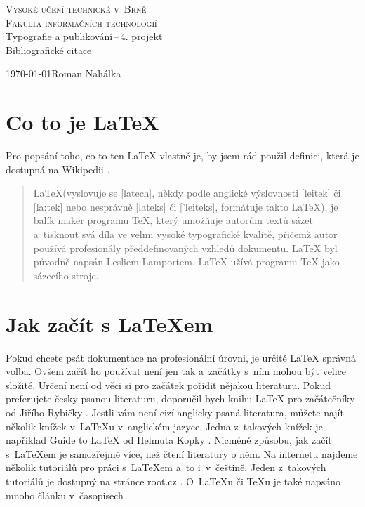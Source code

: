 \documentclass[a4paper, 11pt]{article}
\begin{document}
\begin{titlepage}
\begin{center}
{\Huge \textsc{Vysoké učení technické v~Brně}\\ \huge \textsc{Fakulta informačních technologií\\}}
{\LARGE Typografie a publikování\,--\,4. projekt\\ \Huge Bibliografické citace}
\end{center}
{\Large \today \hfill Roman Nahálka}
\end{titlepage}

\section{Co to je \LaTeX}
Pro popsání toho, co to ten {\LaTeX} vlastně je, by jsem rád použil definici, která je dostupná na Wikipedii \cite{Wikipedia}.
\begin{quote}
\LaTeX(vyslovuje se [latech], někdy podle anglické výslovnosti [leitek] či [la:tek] nebo nesprávně [lateks] či ['leiteks], formátuje takto \LaTeX), je balík maker programu \TeX, který umožňuje autorům textů sázet a~tisknout svá díla ve velmi vysoké typografické kvalitě, přičemž autor používá profesionály předdefinovaných vzhledů dokumentu. {\LaTeX} byl původně napsán Lesliem Lamportem. {\LaTeX} užívá programu {\TeX} jako sázecího stroje.
\end{quote}

\section{Jak začít s \LaTeX em}
Pokud chcete psát dokumentace na profesionální úrovni, je určitě {\LaTeX} správná volba. Ovšem začít ho používat není jen tak a~začátky s~ním mohou být velice složité. Určení není od věci si pro začátek pořídit nějakou literaturu. Pokud preferujete česky psanou literaturu, doporučil bych knihu {\LaTeX} pro začátečníky od Jiřího Rybičky \cite{Rybicka}. Jestli vám není cizí anglicky psaná literatura, můžete najít několik knížek v~\LaTeX u v~anglickém jazyce. Jedna z~takových knížek je například Guide to {\LaTeX} od Helmuta Kopky \cite{Helmut}. Nicméně způsobu, jak začít s~\LaTeX em je samozřejmě více, než čtení literatury o něm. Na internetu najdeme několik tutoriálů pro práci s~\LaTeX em a~to i~v~češtině. Jeden z~takových tutoriálů je dostupný na stránce root.cz \cite{Root}. O~\LaTeX u či \TeX u je také napsáno mnoho článku v~časopisech \cite{AUUGN} \cite{PCMag}.
\end{document}
